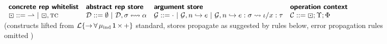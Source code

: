 \documentclass[9pt,preprint]{sigplanconf}
\newcommand{\moutput}{^{\color{gray}{+}}}
\begin{document}
\begin{figure*}[p!]
\small
$\begin{array}{llll}
\mvlbl{concrete rep whitelist} & \mvlbl{abstract rep store} & \mvlbl{argument store} & \mvlbl{operation context}\\
\boxdot ::= {\rightharpoonup} ~|~ \boxdot, \tc \ & \memD ::= \emptyset ~|~ \memD, \st \leftrightsquigarrow \alpha & \memG ::= \cdot ~|~ \memG, n \hookrightarrow e ~|~ \memG, n \hookrightarrow e : \st \leadsto \iota/x : \tau & \aCtx ::= \boxdot; \Upsilon; \Phi 
\end{array}$~\hfill{\fbox{$\snorm{\st}{\memD}{\memG}{\aCtx}{\st\moutput}{\memD\moutput}{\memG\moutput}$}}\\
{\color{gray} (constructs lifted from $\mathcal{L}\{{\rightarrow}\,{\forall}\,{\mu_\text{ind}}\,{\kunit}\,{\times}\,{+}\}$ standard, stores propagate as suggested by rules below, error propagation rules omitted \cite{pfpl})}
~\hfill\fbox{$\serrX{\st}$}
\begin{mathpar}






\end{mathpar}
\end{figure*}
\end{document}
